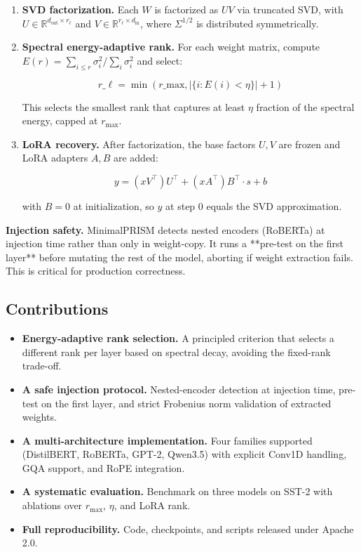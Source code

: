 \begin{enumerate}
\item \textbf{SVD factorization.} Each $W$ is factorized as $U V$ via truncated SVD,
  with $U \in \mathbb{R}^{d_\text{out} \times r_\ell}$ and
  $V \in \mathbb{R}^{r_\ell \times d_\text{in}}$, where $\Sigma^{1/2}$ is
  distributed symmetrically.

\item \textbf{Spectral energy-adaptive rank.} For each weight matrix, compute
  $E(r) = \sum_{i \leq r} \sigma_i^2 / \sum_i \sigma_i^2$ and select:

  $$
  r\_\ell = \min\!\left(r\_\text{max}, \left|\{i : E(i) < \eta\}\right| + 1\right)
  \tag{1.4}
  $$

  This selects the smallest rank that captures at least $\eta$ fraction of
  the spectral energy, capped at $r_\text{max}$.

\item \textbf{LoRA recovery.} After factorization, the base factors $U, V$ are
  frozen and LoRA adapters $A, B$ are added:

  $$
  y = (x V^\top) U^\top + (x A^\top) B^\top \cdot s + b
  \tag{1.5}
  $$

  with $B = 0$ at initialization, so $y$ at step 0 equals the SVD
  approximation.

\end{enumerate}
\textbf{Injection safety.} MinimalPRISM detects nested encoders (RoBERTa) at 
injection time rather than only in weight-copy. It runs a **pre-test on the 
first layer** before mutating the rest of the model, aborting if weight 
extraction fails. This is critical for production correctness.

\subsection{Contributions}

\begin{itemize}
\item \textbf{Energy-adaptive rank selection.} A principled criterion that selects
  a different rank per layer based on spectral decay, avoiding the
  fixed-rank trade-off.
\item \textbf{A safe injection protocol.} Nested-encoder detection at injection time,
  pre-test on the first layer, and strict Frobenius norm validation of
  extracted weights.
\item \textbf{A multi-architecture implementation.} Four families supported
  (DistilBERT, RoBERTa, GPT-2, Qwen3.5) with explicit Conv1D handling, GQA
  support, and RoPE integration.
\item \textbf{A systematic evaluation.} Benchmark on three models on SST-2 with
  ablations over $r_\text{max}$, $\eta$, and LoRA rank.
\item \textbf{Full reproducibility.} Code, checkpoints, and scripts released under
  Apache 2.0.

\end{itemize}
